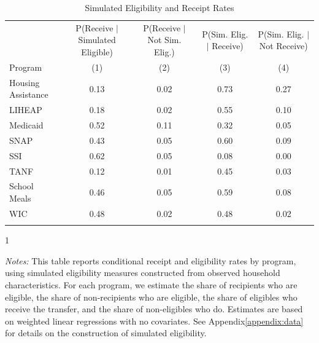 \begin{table}[ht!]
  \centering
  \caption{Simulated Eligibility and Receipt Rates}
  \label{tab:welfare_slope}\small
  \begin{tabular*}{1.36\textwidth}{@{\extracolsep{\fill}}lcccc@{}}
  \toprule
\addlinespace 
& P(Receive $|$ Simulated Eligible) & P(Receive $|$ Not Sim. Elig.) &
P(Sim. Elig. $|$ Receive) & P(Sim. Elig. $|$ Not Receive) \\ 
Program   & (1) & (2) & (3) & (4) \\ \addlinespace
\hline \addlinespace
Housing Assistance & 0.13 & 0.02 & 0.73
& 0.27 \\
LIHEAP & 0.18 & 0.02 & 0.55
& 0.10 \\ 
Medicaid & 0.52 & 0.11 & 0.32
& 0.05 \\ 
SNAP & 0.43 & 0.05 & 0.60
& 0.09 \\
SSI & 0.62 & 0.05 & 0.08
& 0.00 \\ 
TANF & 0.12 & 0.01 & 0.45
& 0.03 \\
School Meals & 0.46 & 0.05 & 0.59
& 0.08 \\ 
WIC & 0.48 & 0.02 & 0.48
& 0.02 \\   \addlinespace \bottomrule
\end{tabular*}
\begin{spacing}{1}
\begin{tablenotes}
\item \footnotesize \textit{Notes:} This table reports conditional receipt and eligibility rates by program, using simulated eligibility measures constructed from observed household characteristics. For each program, we estimate the share of recipients who are eligible, the share of non-recipients who are eligible, the share of eligibles who receive the transfer, and the share of non-eligibles who do. Estimates are based on weighted linear regressions with no covariates. See Appendix\ref{appendix:data} for details on the construction of simulated eligibility.
\end{tablenotes}
\end{spacing}
\end{table}
